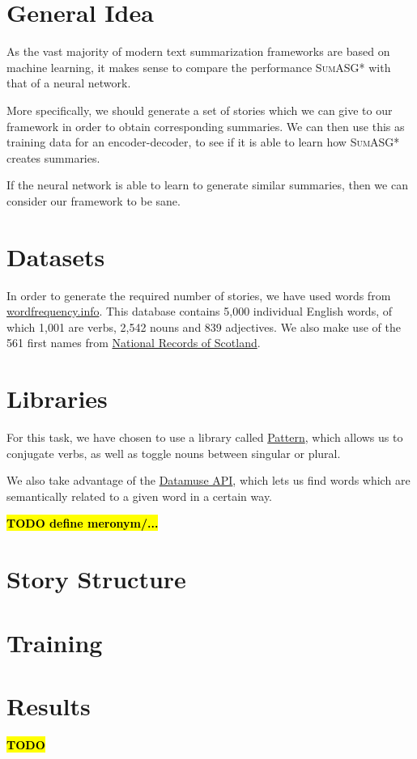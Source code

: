 \label{chapter:evaluation}

\section{General Idea}

As the vast majority of modern text summarization frameworks are based on machine learning, it makes sense to compare the performance \textsc{SumASG*} with that of a neural network.

More specifically, we should generate a set of stories which we can give to our framework in order to obtain corresponding summaries. We can then use this as training data for an encoder-decoder, to see if it is able to learn how \textsc{SumASG*} creates summaries.

If the neural network is able to learn to generate similar summaries, then we can consider our framework to be sane.

\section{Datasets}

In order to generate the required number of stories, we have used words from \href{http://www.wordfrequency.info/}{wordfrequency.info}. This database contains 5,000 individual English words, of which 1,001 are verbs, 2,542 nouns and 839 adjectives. We also make use of the 561 first names from \href{https://www.nrscotland.gov.uk/statistics-and-data/statistics/statistics-by-theme/vital-events/names/babies-first-names/babies-first-names-summary-records-comma-separated-value-csv-format}{National Records of Scotland}.

\section{Libraries}

For this task, we have chosen to use a library called \href{http://web.archive.org/web/20190516161631/https://www.clips.uantwerpen.be/pages/pattern-en}{Pattern}, which allows us to conjugate verbs, as well as toggle nouns between singular or plural.

We also take advantage of the \href{https://www.datamuse.com/api/}{Datamuse API}, which lets us find words which are semantically related to a given word in a certain way.

\textcolor{red}{\textbf{\hl{TODO define meronym/...}}}

\section{Story Structure}

\section{Training}

\section{Results}

\textcolor{red}{\textbf{\hl{TODO}}}